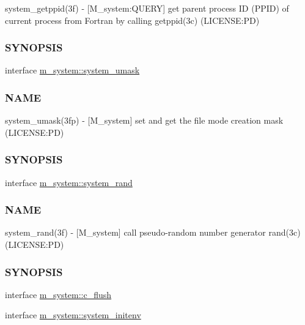 \begin{DoxyCompactItemize}
\begin{DoxyCompactList}
system\+\_\+getppid(3f) -\/ \mbox{[}M\+\_\+system\+:Q\+U\+E\+RY\mbox{]} get parent process ID (P\+P\+ID) of current process from Fortran by calling getppid(3c) (L\+I\+C\+E\+N\+SE\+:PD) \subsubsection*{S\+Y\+N\+O\+P\+S\+IS}\end{DoxyCompactList}\item 
interface \mbox{\hyperlink{interfacem__system_1_1system__umask}{m\+\_\+system\+::system\+\_\+umask}}
\begin{DoxyCompactList}\small\item\em \subsubsection*{N\+A\+ME}

system\+\_\+umask(3fp) -\/ \mbox{[}M\+\_\+system\mbox{]} set and get the file mode creation mask (L\+I\+C\+E\+N\+SE\+:PD) \subsubsection*{S\+Y\+N\+O\+P\+S\+IS}\end{DoxyCompactList}\item 
interface \mbox{\hyperlink{interfacem__system_1_1system__rand}{m\+\_\+system\+::system\+\_\+rand}}
\begin{DoxyCompactList}\small\item\em \subsubsection*{N\+A\+ME}

system\+\_\+rand(3f) -\/ \mbox{[}M\+\_\+system\mbox{]} call pseudo-\/random number generator rand(3c) (L\+I\+C\+E\+N\+SE\+:PD) \subsubsection*{S\+Y\+N\+O\+P\+S\+IS}\end{DoxyCompactList}\item 
interface \mbox{\hyperlink{interfacem__system_1_1c__flush}{m\+\_\+system\+::c\+\_\+flush}}
\item 
interface \mbox{\hyperlink{interfacem__system_1_1system__initenv}{m\+\_\+system\+::system\+\_\+initenv}}
\end{DoxyCompactItemize}
